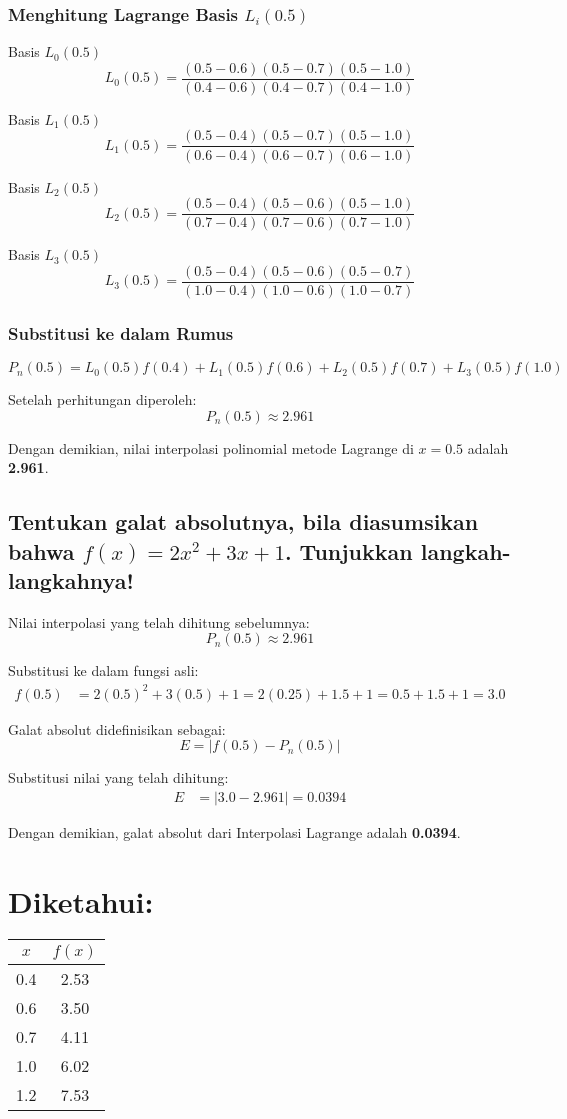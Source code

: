 \documentclass{article}
\begin{document}
\subsubsection{Menghitung Lagrange Basis \( L_i(0.5)\)}
Basis \( L_0(0.5) \) 
\[
L_0(0.5) = \frac{(0.5 - 0.6)(0.5 - 0.7)(0.5 - 1.0)}{(0.4 - 0.6)(0.4 - 0.7)(0.4 - 1.0)}
\]

Basis \( L_1(0.5) \)
\[
L_1(0.5) = \frac{(0.5 - 0.4)(0.5 - 0.7)(0.5 - 1.0)}{(0.6 - 0.4)(0.6 - 0.7)(0.6 - 1.0)}
\]

Basis \( L_2(0.5) \)
\[
L_2(0.5) = \frac{(0.5 - 0.4)(0.5 - 0.6)(0.5 - 1.0)}{(0.7 - 0.4)(0.7 - 0.6)(0.7 - 1.0)}
\]

Basis \( L_3(0.5) \)
\[
L_3(0.5) = \frac{(0.5 - 0.4)(0.5 - 0.6)(0.5 - 0.7)}{(1.0 - 0.4)(1.0 - 0.6)(1.0 - 0.7)}
\]

\subsubsection{Substitusi ke dalam Rumus}
\[
P_n(0.5) = L_0(0.5) f(0.4) + L_1(0.5) f(0.6) + L_2(0.5) f(0.7) + L_3(0.5) f(1.0)
\]

Setelah perhitungan diperoleh:
\[
P_n(0.5) \approx 2.961
\]

Dengan demikian, nilai interpolasi polinomial metode Lagrange di \( x = 0.5 \) adalah \textbf{2.961}.

\subsection{Tentukan galat absolutnya, bila diasumsikan bahwa $f(x) = 2x^2 + 3x +1$. Tunjukkan langkah-langkahnya!}

Nilai interpolasi yang telah dihitung sebelumnya:
\[
P_n(0.5) \approx 2.961
\]

Substitusi  ke dalam fungsi asli:
\begin{align*}
f(0.5) &= 2(0.5)^2 + 3(0.5) + 1 
= 2(0.25) + 1.5 + 1 
= 0.5 + 1.5 + 1 
= 3.0
\end{align*}

Galat absolut didefinisikan sebagai:
\[
E = | f(0.5) - P_n(0.5) |
\]

Substitusi nilai yang telah dihitung:
\begin{align*}
E &= |3.0 - 2.961| = 0.0394
\end{align*}

Dengan demikian, galat absolut dari Interpolasi Lagrange adalah \textbf{0.0394}.

\section{Diketahui:}
\begin{center}
\begin{tabular}{|c|c|}
    \hline
    $x$ & $f(x)$ \\
    \hline
    0.4 & 2.53 \\
    0.6 & 3.50 \\
    0.7 & 4.11 \\
    1.0 & 6.02 \\
    1.2 & 7.53 \\
    \hline
\end{tabular}
\end{center}
\end{document}

